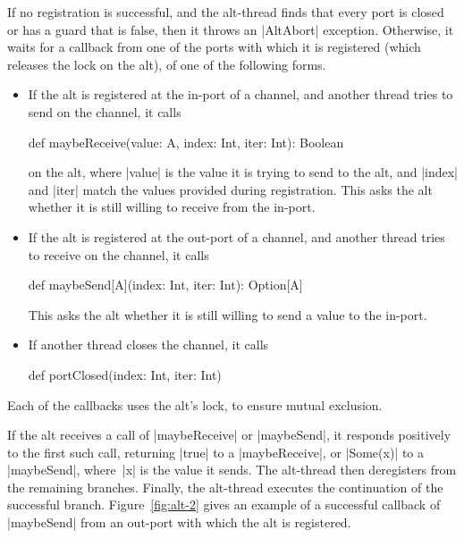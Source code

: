 If no registration is successful, and the alt-thread finds that every port is
closed or has a guard that is false, then it throws an |AltAbort| exception.
Otherwise, it waits for a callback from one of the ports with which it is
registered (which releases the lock on the alt), of one of the following
forms.
%
\begin{itemize}
\item If the alt is registered at the in-port of a channel, and another thread
  tries to send on the channel, it calls
\begin{scala}
def maybeReceive(value: A, index: Int, iter: Int): Boolean
\end{scala}
%
on the alt, where |value| is the value it is trying to send to the alt, and
|index| and |iter| match the values provided during registration.  This asks
the alt whether it is still willing to receive from the in-port.

\item If the alt is registered at the out-port of a channel, and another thread
  tries to receive on the channel, it calls
%
\begin{scala}
def maybeSend[A](index: Int, iter: Int): Option[A]
\end{scala}
%
This asks the alt whether it is still willing to send a value to the in-port.

\item If another thread closes the channel, it calls 
%
\begin{scala}
def portClosed(index: Int, iter: Int)
\end{scala}
\end{itemize}
%
Each of the callbacks uses the alt's lock, to ensure mutual exclusion. 

If the alt receives a call of |maybeReceive| or |maybeSend|, it responds
positively to the first such call, returning |true| to a |maybeReceive|, or
|Some(x)| to a |maybeSend|, where~|x| is the value it sends.  The alt-thread
then deregisters from the remaining branches.
%
Finally, the alt-thread
executes the continuation of the successful branch.
%
Figure~\ref{fig:alt-2} gives an example of a successful callback of
|maybeSend| from an out-port with which the alt is registered.

